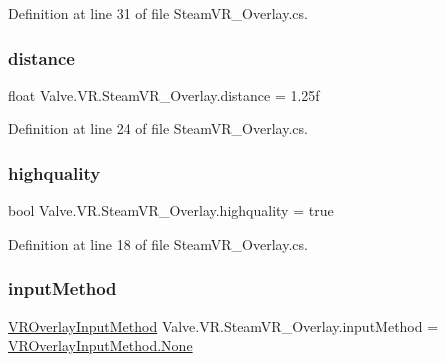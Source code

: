 Definition at line 31 of file Steam\+V\+R\+\_\+\+Overlay.\+cs.

\mbox{\label{class_valve_1_1_v_r_1_1_steam_v_r___overlay_a3d408a02ce99a9e017d2d5c279fd03ab}} 
\subsubsection{\texorpdfstring{distance}{distance}}
{\footnotesize\ttfamily float Valve.\+V\+R.\+Steam\+V\+R\+\_\+\+Overlay.\+distance = 1.\+25f}



Definition at line 24 of file Steam\+V\+R\+\_\+\+Overlay.\+cs.

\mbox{\label{class_valve_1_1_v_r_1_1_steam_v_r___overlay_a7826db14b3da23e8a1e88835cab88b21}} 
\subsubsection{\texorpdfstring{highquality}{highquality}}
{\footnotesize\ttfamily bool Valve.\+V\+R.\+Steam\+V\+R\+\_\+\+Overlay.\+highquality = true}



Definition at line 18 of file Steam\+V\+R\+\_\+\+Overlay.\+cs.

\mbox{\label{class_valve_1_1_v_r_1_1_steam_v_r___overlay_a4403bb8497e4ad304c5ff45cd8387932}} 
\subsubsection{\texorpdfstring{inputMethod}{inputMethod}}
{\footnotesize\ttfamily \mbox{\hyperlink{namespace_valve_1_1_v_r_a43f4e4c6980efb8b0d2a954640203d74}{V\+R\+Overlay\+Input\+Method}} Valve.\+V\+R.\+Steam\+V\+R\+\_\+\+Overlay.\+input\+Method = \mbox{\hyperlink{namespace_valve_1_1_v_r_a43f4e4c6980efb8b0d2a954640203d74a6adf97f83acf6453d4a6a4b1070f3754}{V\+R\+Overlay\+Input\+Method.\+None}}}



